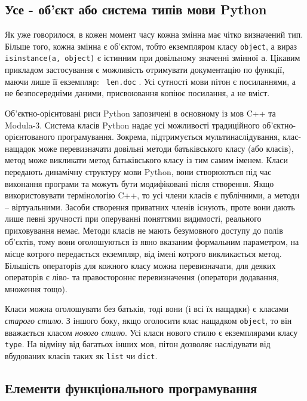 \documentclass[a4paper, 12pt]{article}
\begin{document}
\subsection{Усе - об'єкт або система типів мови Python}
Як уже говорилося, в кожен момент часу кожна змінна має чітко визначений тип. Більше того,
кожна змінна є об'єктом, тобто екземпляром класу \texttt{object}, а вираз 
\texttt{isinstance(a, object)} є істинним при довільному значенні змінної \texttt{a}. 
Цікавим прикладом застосування є можливість отримувати документацію по функції, маючи
лише її екземпляр: 
\texttt{ len.\textunderscore\textunderscore doc\textunderscore\textunderscore } . 
Усі сутності мови пітон є посиланнями, а не
безпосередніми даними, присвоювання копіює посилання, а не вміст. 

Об'єктно-орієнтовані риси Python запозичені в основному із мов C++ та Modula-3. Система 
класів Python надає усі можливості традиційного об'єктно-орієнтованого програмування.
Зокрема, підтримується мультинаслідування, клас-нащадок може перевизначати довільні методи 
батьківського класу (або класів), метод може викликати метод батьківського класу із тим самим іменем. Класи передають динамічну структуру мови Python, вони створюються під час виконання програми та можуть бути модифіковані після створення. Якщо використовувати термінологію C++, то усі члени класів є публічними, а методи -- віртуальними. Засоби створення приватних членів існують, проте вони дають лише певні зручності при оперуванні поняттями видимості, реального приховування немає. Методи класів не мають безумовного доступу до полів об'єктів, тому вони оголошуються із явно вказаним формальним параметром, на місце котрого передається екземпляр, від імені котрого викликається метод. Більшість операторів для кожного класу можна перевизначати, для деяких операторів є ліво- та правостороннє перевизначення (оператори додавання, множення тощо).

Класи можна оголошувати без батьків, тоді вони (і всі їх нащадки) є класами \emph{старого стилю}. З іншого боку, якщо оголосити клас нащадком \texttt{object}, то він вважається класом \emph{нового стилю}. Усі класи нового стилю є екземплярами класу \texttt{type}.
На відміну від багатьох інших мов, пітон дозволяє наслідувати від вбудованих класів таких як \texttt{list} чи \texttt{dict}. 


\subsection{Елементи функціонального програмування}
\end{document}
